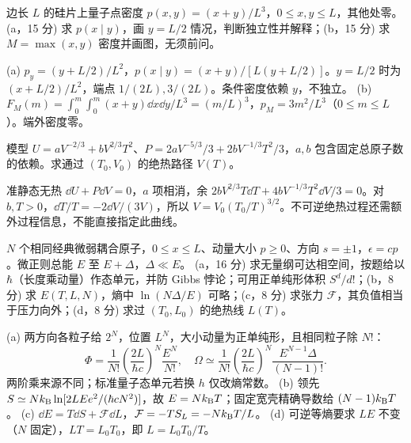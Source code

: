 \begin{exercise}
边长 $L$ 的硅片上量子点密度 $p(x,y)=(x+y)/L^3$，$0\le x,y\le L$，其他处零。
(a，15 分) 求 $p(x\mid y)$，画 $y=L/2$ 情况，判断独立性并解释；(b，15 分) 求 $M=\max(x,y)$ 密度并画图，无须前问。
\end{exercise}
\begin{solution}
(a) $p_y=(y+L/2)/L^2$，$p(x\mid y)=(x+y)/[L(y+L/2)]$。$y=L/2$ 时为 $(x+L/2)/L^2$，端点 $1/(2L),3/(2L)$。条件密度依赖 $y$，不独立。
(b) $F_M(m)=\int_0^m\int_0^m(x+y)\dd x\dd y/L^3=(m/L)^3$，$p_M=3m^2/L^3$（$0\le m\le L$）。端外密度零。
\end{solution}
\begin{center}\end{center}
\begin{exercise}
模型 $U=aV^{-2/3}+bV^{2/3}T^2$、$P=2aV^{-5/3}/3+2bV^{-1/3}T^2/3$，$a,b$ 包含固定总原子数的依赖。求通过 $(T_0,V_0)$ 的绝热路径 $V(T)$。
\end{exercise}
\begin{solution}
准静态无热 $\dd U+P\dd V=0$，$a$ 项相消，余 $2bV^{2/3}T\dd T+4bV^{-1/3}T^2\dd V/3=0$。对 $b,T>0$，$\dd T/T=-2\dd V/(3V)$，所以 $V=V_0(T_0/T)^{3/2}$。不可逆绝热过程还需额外过程信息，不能直接指定此曲线。
\end{solution}
\begin{exercise}
$N$ 个相同经典微弱耦合原子，$0\le x\le L$、动量大小 $p\ge0$、方向 $s=\pm1$，$\epsilon=cp$。微正则总能 $E$ 至 $E+\Delta$，$\Delta\ll E$。
(a，16 分) 求无量纲可达相空间，按题给以 $\hbar$（长度乘动量）作态单元，并防 Gibbs 悖论；可用正单纯形体积 $S^d/d!$；(b，8 分) 求 $E(T,L,N)$，熵中 $\ln(N\Delta/E)$ 可略；(c，8 分) 求张力 $\mathcal F$，其负值相当于压力向外；(d，8 分) 求过 $(T_0,L_0)$ 的绝热线 $L(T)$。
\end{exercise}
\begin{solution}
(a) 两方向各粒子给 $2^N$，位置 $L^N$，大小动量为正单纯形，且相同粒子除 $N!$：
\[\Phi=\frac1{N!}\left(\frac{2L}{\hbar c}\right)^N\frac{E^N}{N!},\quad
\Omega\simeq\frac1{N!}\left(\frac{2L}{\hbar c}\right)^N\frac{E^{N-1}\Delta}{(N-1)!}.\]
两阶乘来源不同；标准量子态单元若换 $h$ 仅改熵常数。
(b) 领先 $S\simeq Nk_{\mathrm B}\ln[2L E e^2/(\hbar cN^2)]$，故 $E=Nk_{\mathrm B} T$；固定宽壳精确导数给 $(N-1)k_{\mathrm B} T$。
(c) $\dd E=T\dd S+\mathcal F\dd L$，$\mathcal F=-T S_L=-Nk_{\mathrm B} T/L$。
(d) 可逆等熵要求 $LE$ 不变（$N$ 固定），$LT=L_0T_0$，即 $L=L_0T_0/T$。
\end{solution}
